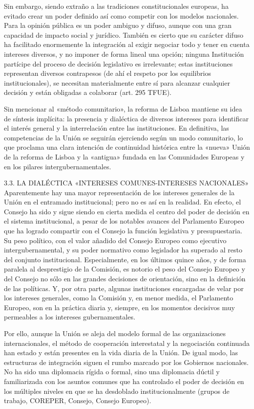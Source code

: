 \documentclass[10pt,a4paper]{article}
\begin{document}
Sin embargo, siendo extraño a las tradiciones constitucionales europeas, ha evitado crear un poder definido así como competir con los modelos nacionales. Para la opinión pública es un poder ambiguo y difuso, aunque con una gran capacidad de impacto social y jurídico. También es cierto que su carácter difuso ha facilitado enormemente la integración al exigir negociar todo y tener en cuenta intereses diversos, y no imponer de forma lineal una opción; ninguna Institución partícipe del proceso de decisión legislativo es irrelevante; estas instituciones representan diversos contrapesos (de ahí el respeto por los equilibrios institucionales), se necesitan materialmente entre sí para alcanzar cualquier decisión y están obligadas a colaborar (art. 295 TFUE).

Sin mencionar al «método comunitario», la reforma de Lisboa mantiene su idea de síntesis implícita: la presencia y dialéctica de diversos intereses para identificar el interés general y la interrelación entre las instituciones. En definitiva, las competencias de la Unión se seguirán ejerciendo según un modo comunitario, lo que proclama una clara intención de continuidad histórica entre la «nueva» Unión de la reforma de Lisboa y la «antigua» fundada en las Comunidades Europeas y en los pilares intergubernamentales. 

3.3. LA DIALÉCTICA «INTERESES COMUNES-INTERESES NACIONALES» 
Aparentemente hay una mayor representación de los intereses generales de la Unión en el entramado institucional; pero no es así en la realidad. En efecto, el Consejo ha sido y sigue siendo en cierta medida el centro del poder de decisión en el sistema institucional, a pesar de los notables avances del Parlamento Europeo que ha logrado compartir con el Consejo la función legislativa y presupuestaria. Su peso político, con el valor añadido del Consejo Europeo como ejecutivo intergubernamental, y su poder normativo como legislador ha superado al resto del conjunto institucional. Especialmente, en los últimos quince años, y de forma paralela al desprestigio de la Comisión, es notorio el peso del Consejo Europeo y del Consejo no sólo en las grandes decisiones de orientación, sino en la definición de las políticas. Y, por otra parte, algunas instituciones encargadas de velar por los intereses generales, como la Comisión y, en menor medida, el Parlamento Europeo, son en la práctica diaria y, siempre, en los momentos decisivos muy permeables a los intereses gubernamentales.

Por ello, aunque la Unión se aleja del modelo formal de las organizaciones internacionales, el método de cooperación interestatal y la negociación continuada han estado y están presentes en la vida diaria de la Unión. De igual modo, las estructuras de integración siguen el rumbo marcado por los Gobiernos nacionales. No ha sido una diplomacia rígida o formal, sino una diplomacia dúctil y familiarizada con los asuntos comunes  que ha controlado el poder de decisión en los múltiples niveles en que se ha desdoblado institucionalmente (grupos de trabajo, COREPER, Consejo, Consejo Europeo).
\end{document}
